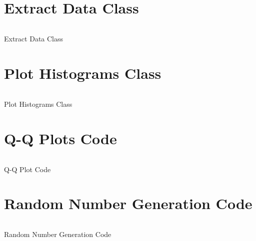 \documentclass[final, hidelinks, 12pt, a4paper]{article}
\newenvironment{code}{\captionsetup{type=listing}}{}
\begin{document}
    \printglossaries
    \glsaddallunused
    \clearpage
   

    \printbibliography
    \clearpage


    \noappendicestocpagenum
    \addappheadtotoc

    \begin{appendices}
        \section{Extract Data Class}
        \label{app:extractDatapy}
        \begin{code}
            \footnotesize
            \inputminted[linenos=true, fontfamily=courier, autogobble, breaklines, bgcolor=bg]{Python}{./Imports/Code/Extract_Data.py}
            \caption{Extract Data Class}
            \label{lst:extractDatapy}
        \end{code}
        \section{Plot Histograms Class}
        \label{sct:plotHistograms}
        \begin{code}
            \footnotesize
            \inputminted[linenos=true, fontfamily=courier, autogobble, breaklines, bgcolor=bg]{Python}{./Imports/Code/plot_histograms.py}
            \caption{Plot Histograms Class}
            \label{lst:plotHistograms}
        \end{code}
        \section{Q-Q Plots Code}
        \label{sct:qqplotspy}
        \begin{code}
            \footnotesize
            \inputminted[linenos=true, fontfamily=courier, autogobble, breaklines, bgcolor=bg]{Python}{./Imports/Code/plot_QQs.py}
            \caption{Q-Q Plot Code}
            \label{lst:qqplotspy}
        \end{code}
        \section{Random Number Generation Code}
        \label{sct:ranGen}
        \begin{code}
            \footnotesize
            \inputminted[linenos=true, fontfamily=courier, autogobble, breaklines, bgcolor=bg]{Python}{./Imports/Code/RandomNumberGeneration.py}
            \caption{Random Number Generation Code}
            \label{lst:ranNumGen}
        \end{code}
        \clearpage        

    \end{appendices}
    
\end{document}
